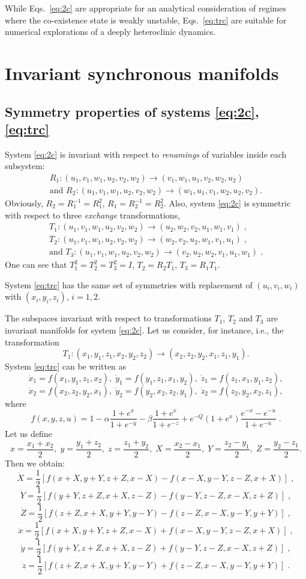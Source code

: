 \documentclass[3p,number,review,sort&compress]{elsarticle}
\begin{document}
While Eqs.~\eqref{eq:2c} are appropriate for an analytical consideration
of regimes where the co-existence state is weakly unstable, Eqs.~\eqref{eq:trc} are suitable for numerical explorations of a deeply
heteroclinic dynamics.

\section{Invariant synchronous manifolds}
\label{sec:ism}
\subsection{Symmetry properties of systems \eqref{eq:2c}, \eqref{eq:trc}}
System \eqref{eq:2c} is invariant with respect to {\em renamings} of variables inside each subsystem:
\begin{equation}
\begin{gathered}
R_1:(u_1,v_1,w_1,u_2,v_2,w_2)\to(v_1,w_1,u_1,v_2,w_2,u_2)\\
\text{and }
R_2:(u_1,v_1,w_1,u_2,v_2,w_2)\to(w_1,u_1,v_1,w_2,u_2,v_2).
\end{gathered}
\label{eq:renam}
\end{equation}
Obviously, $R_2=R_1^{-1}=R_1^2$, $R_1=R_2^{-1}=R_2^2$. Also, system \eqref{eq:2c} is symmetric with respect to three {\em exchange} transformations,
\begin{equation}
\begin{gathered}
T_1:(u_1,v_1,w_1,u_2,v_2,w_2)\to(u_2,w_2,v_2,u_1,w_1,v_1)\;,\\
T_2:(u_1,v_1,w_1,u_2,v_2,w_2)\to(w_2,v_2,u_2,w_1,v_1,u_1)\;,\\
\text{and }
T_3:(u_1,v_1,w_1,u_2,v_2,w_2)\to(v_2,u_2,w_2,v_1,u_1,w_1)\;.
\end{gathered}
\label{eq:exch}
\end{equation}
One can see that $T_1^2=T_2^2=T_3^2=I$, $T_2=R_2T_1$, $T_3=R_1T_1$.

System \eqref{eq:trc} has the same set of symmetries with replacement of $(u_i,v_i,w_i)$ with $(x_i,y_i,z_i)$, $i=1,2$.

The subspaces invariant with respect to transformations $T_1$, $T_2$ and $T_3$ are invariant manifolds for system \eqref{eq:2c}. Let us consider, for instance, i.e., the transformation
$$T_1:(x_1,y_1,z_1,x_2,y_2,z_2)\to(x_2,z_2,y_2,x_1,z_1,y_1).$$
System \eqref{eq:trc} can be written as
$$\dot{x}_1=f(x_1,y_1,z_1,x_2),\;\dot{y}_1=f(y_1,z_1,x_1,y_2),\;\dot{z}_1=f(z_1,x_1,y_1,z_2),$$
$$\dot{x}_2=f(x_2,z_2,y_2,x_1),\;\dot{y}_2=f(y_2,x_2,z_2,y_1),\;\dot{z}_2=f(z_2,y_2,x_2,z_1),$$
where
$$f(x,y,z,u)=1-\alpha\frac{1+e^x}{1+e^{-y}}-\beta\frac{1+e^x}{1+e^{-z}}+e^{-Q}(1+e^x)\frac{e^{-x}-e^{-u}}{1+e^{-u}}\;.$$
Let us define
$$x=\frac{x_1+x_2}{2},\;y=\frac{y_1+z_2}{2},\;z=\frac{z_1+y_2}{2},\;X=\frac{x_2-x_1}{2},\;Y=\frac{z_2-y_1}{2},\;Z=\frac{y_2-z_1}{2}.$$
Then we obtain:
$$\dot{X}=\frac{1}{2}[f(x+X,y+Y,z+Z,x-X)-f(x-X,y-Y,z-Z,x+X)]\;,$$
$$\dot{Y}=\frac{1}{2}[f(y+Y,z+Z,x+X,z-Z)-f(y-Y,z-Z,x-X,z+Z)]\;,$$
$$\dot{Z}=\frac{1}{2}[f(z+Z,x+X,y+Y,y-Y)-f(z-Z,x-X,y-Y,y+Y)]\;,$$
$$\dot{x}=\frac{1}{2}[f(x+X,y+Y,z+Z,x-X)+f(x-X,y-Y,z-Z,x+X)]\;,$$
$$\dot{y}=\frac{1}{2}[f(y+Y,z+Z,x+X,z-Z)+f(y-Y,z-Z,x-X,z+Z)]\;,$$
$$\dot{z}=\frac{1}{2}[f(z+Z,x+X,y+Y,y-Y)+f(z-Z,x-X,y-Y,y+Y)]\;.$$
\end{document}
